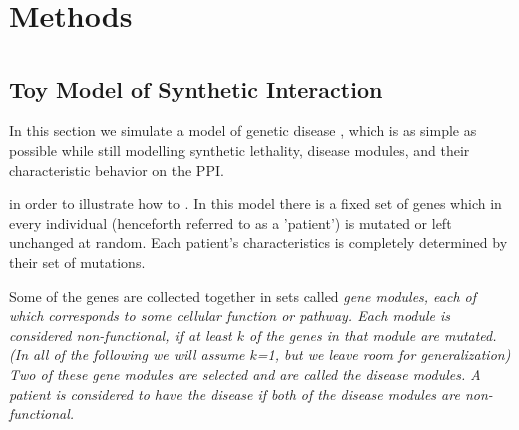 \documentclass[a4paper,english]{article}
\begin{document}



\section{Methods}

\section{}






\subsection{Toy Model of Synthetic Interaction}






In this section we simulate a model of genetic disease , which is as simple as possible 
while still modelling synthetic lethality, disease modules,
 and their characteristic behavior on the PPI.

in order to illustrate how to .
In this model there is a fixed set of genes which in every individual (henceforth referred to as a 'patient') is mutated or left unchanged at random. 
Each patient's characteristics is completely determined by their set of mutations. 

Some of the genes are collected together in sets called  \em{gene modules}, each of which corresponds to some cellular function or pathway. 
Each module is considered \em{non-functional}, if at least $k$ of the genes in that module are mutated. (In all of the following we will assume $k$=1,
 but we leave room for generalization)  
 Two of these gene modules are selected and are called the disease modules.
  A patient is considered to \em{have the disease} if both of the disease modules are non-functional.%
\end{document}
